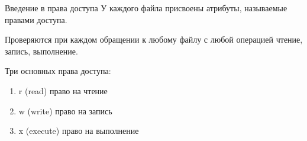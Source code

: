 \begin{frame}{Введение в права доступа}
  У каждого файла присвоены атрибуты, называемые \alert{правами доступа}.
  
  Проверяются при каждом обращении к любому файлу с любой операцией чтение, запись, выполнение.

  Три основных права доступа:
  \begin{enumerate}
    \item \alert{r} (read) право на чтение           
    \item \alert{w} (write) право на запись           
    \item \alert{x} (execute) право на выполнение  
  \end{enumerate}

\end{frame}
